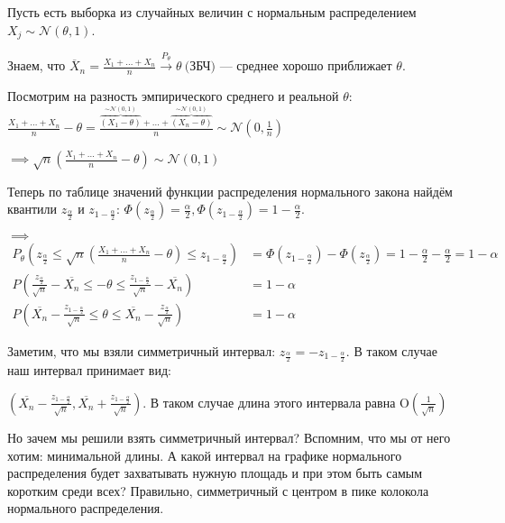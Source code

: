 \begin{example} 
    Пусть есть выборка из случайных величин с нормальным распределением $X_j \sim \mathcal{N}(\theta, 1)$.
    
    Знаем, что $\overline{X}_n = \frac{X_1 + \dots + X_n}{n} \xrightarrow{P_\theta} \theta ~ 
    \text{(ЗБЧ)}$ --- среднее хорошо приближает $\theta$.
    
    Посмотрим на разность эмпирического среднего и реальной $\theta$: 
    $\frac{X_1 + \dots + X_n}{n} - \theta = \frac{\overbrace{(X_1 - \theta)}^{\sim \mathcal{N}(0, 1)} + \dots 
    + \overbrace{(X_n - \theta)}^{\sim \mathcal{N}(0, 1)}}{n} \sim \mathcal{N}(0, \frac{1}{n})$

    $
        \implies \sqrt{n}(\frac{X_1 + \dots + X_n}{n} - \theta) \sim \mathcal{N}(0, 1)
    $

    Теперь по таблице значений функции распределения нормального закона найдём
    квантили $z_{\frac{\alpha}{2}}$ и $z_{1 - \frac{\alpha}{2}}$: $\Phi(z_{\frac{\alpha}{2}}) = \frac{\alpha}{2},
    \Phi(z_{1 - \frac{\alpha}{2}}) = 1 - \frac{\alpha}{2}$.

    $
        \implies$
        \begin{align}
            P_\theta(z_{\frac{\alpha}{2}} \leq \sqrt{n}(\frac{X_1 + \dots + X_n}{n} - \theta) 
        \leq z_{1 - \frac{\alpha}{2}}) &= \Phi(z_{1 - \frac{\alpha}{2}}) - \Phi(z_{\frac{\alpha}{2}}) =
        1 - \frac{\alpha}{2} - \frac{\alpha}{2} = 1 - \alpha
        \\
        P(\frac{z_{\frac{\alpha}{2}}}{\sqrt{n}} - \overline{X_n} \leq -\theta \leq
        \frac{z_{1 - \frac{\alpha}{2}}}{\sqrt{n}} - \overline{X_n}) &= 1 - \alpha
        \\
        P(\overline{X_n} - \frac{z_{1 - \frac{\alpha}{2}}}{\sqrt{n}} \leq \theta \leq \overline{X_n} 
        - \frac{z_{\frac{\alpha}{2}}}{\sqrt{n}}) &= 1 - \alpha
        \end{align}

    Заметим, что мы взяли симметричный интервал: $z_{\frac{\alpha}{2}} = -z_{1 - \frac{\alpha}{2}}$.
    В таком случае наш интервал принимает вид: 
    
    $(\overline{X_n} - \frac{z_{1 - \frac{\alpha}{2}}}{\sqrt{n}},
    \overline{X_n} + \frac{z_{1 - \frac{\alpha}{2}}}{\sqrt{n}})$. В таком случае длина этого
    интервала равна $\text{O}(\frac{1}{\sqrt{n}})$

    Но зачем мы решили взять симметричный интервал? Вспомним, что мы от него хотим: минимальной длины.
    А какой интервал на графике нормального распределения будет захватывать нужную площадь и при этом
    быть самым коротким среди всех? Правильно, симметричный с центром в пике колокола нормального распределения.
\end{example}

